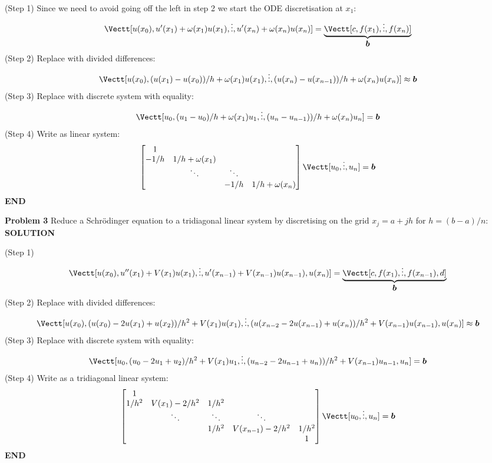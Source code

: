 \documentclass[12pt,a4paper]{article}
\def\b{ {\vc b} }
\begin{document}
(Step 1) Since we need to avoid going off the left in step 2 we start the ODE discretisation at $x_1$:
\[
\Vectt[u(x_0), u'(x_1) +  \ensuremath{\omega}(x_1)u(x_1), \ensuremath{\vdots}, u'(x_n) +  \ensuremath{\omega}(x_n)u(x_n)] = \underbrace{\Vectt[c, f(x_1),\ensuremath{\vdots},f(x_n)]}_{\ensuremath{\bm{\b}}}
\]
(Step 2) Replace with divided differences:
\[
\Vectt[u(x_0), (u(x_1)-u(x_0))/h +  \ensuremath{\omega}(x_1)u(x_1), \ensuremath{\vdots}, (u(x_n)-u(x_{n-1}))/h +  \ensuremath{\omega}(x_n)u(x_n)] \ensuremath{\approx} \ensuremath{\bm{\b}}
\]
(Step 3) Replace with discrete system with equality:
\[
\Vectt[u_0, (u_1-u_0)/h +  \ensuremath{\omega}(x_1)u_1, \ensuremath{\vdots}, (u_n-u_{n-1}))/h +  \ensuremath{\omega}(x_n)u_n] = \ensuremath{\bm{\b}}
\]
(Step 4) Write as linear system:
\[
\begin{bmatrix}
1 \\
-1/h & 1/h + \ensuremath{\omega}(x_1) \\
& \ensuremath{\ddots} & \ensuremath{\ddots} \\
&& -1/h & 1/h + \ensuremath{\omega}(x_n)
\end{bmatrix} \Vectt[u_0,\ensuremath{\vdots},u_n] = \ensuremath{\bm{\b}}
\]
\textbf{END}

\textbf{Problem 3} Reduce a Schrödinger equation to a tridiagonal linear system by discretising on the grid $x_j = a + j h$ for $h = (b-a)/n$:
\textbf{SOLUTION}

(Step 1) 
\[
\Vectt[u(x_0), u''(x_1) + V(x_1) u(x_1), \ensuremath{\vdots}, u'(x_{n-1}) + V(x_{n-1}) u(x_{n-1}), u(x_n)] = \underbrace{\Vectt[c, f(x_1),\ensuremath{\vdots},f(x_{n-1}), d]}_{\ensuremath{\bm{\b}}}
\]
(Step 2) Replace with divided differences:
\[
\Vectt[u(x_0), (u(x_0)-2u(x_1)+u(x_2))/h^2 + V(x_1)u(x_1), \ensuremath{\vdots}, (u(x_{n-2} - 2u(x_{n-1})+u(x_n))/h^2 + V(x_{n-1})u(x_{n-1}), u(x_n)] \ensuremath{\approx} \ensuremath{\bm{\b}}
\]
(Step 3) Replace with discrete system with equality:
\[
\Vectt[u_0, (u_0-2u_1+u_2)/h^2 + V(x_1)u_1, \ensuremath{\vdots}, (u_{n-2}-2u_{n-1}+u_n))/h^2+ V(x_{n-1})u_{n-1},u_n] = \ensuremath{\bm{\b}}
\]
(Step 4) Write as a tridiagonal linear system:
\[
\begin{bmatrix}
1 \\
1/h^2 & V(x_1)-2/h^2 & 1/h^2 \\
& \ensuremath{\ddots} & \ensuremath{\ddots} & \ensuremath{\ddots} \\
&&1/h^2 & V(x_{n-1})-2/h^2 & 1/h^2 \\
&& &&1
\end{bmatrix} \Vectt[u_0,\ensuremath{\vdots},u_n] = \ensuremath{\bm{\b}}
\]
\textbf{END}
\end{document}
